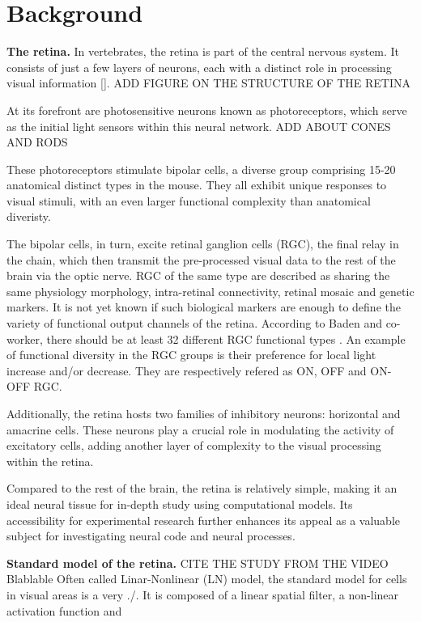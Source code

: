 \section{Background}\label{sec:background}

\textbf{The retina.}
In vertebrates, the retina is part of the central nervous system. It consists
of just a few layers of neurons, each with a distinct role in processing visual
information \ref*{}. ADD FIGURE ON THE STRUCTURE OF THE RETINA

At its forefront are photosensitive neurons known as photoreceptors, which
serve as the initial light sensors within this neural network. ADD ABOUT CONES
AND RODS

These photoreceptors stimulate bipolar cells, a diverse group comprising 15-20
anatomical
distinct types in the mouse. They all exhibit unique
responses to visual stimuli, with an even larger functional complexity than
anatomical diveristy. %

The bipolar cells, in turn, excite retinal ganglion cells (RGC), the final
relay in the
chain, which then transmit the pre-processed visual data to the rest of the
brain
via the optic nerve. RGC of the same type are described as sharing the same
physiology morphology,
intra-retinal connectivity, retinal mosaic and genetic markers. It is not yet
known if such biological markers are enough to define the variety of functional
output channels of the retina. According to Baden and co-worker, there should
be at least 32 different RGC
functional types \citep*{baden_functional_2016}. An example of functional
diversity in the RGC groups is their preference for local light increase and/or
decrease. They are respectively refered as ON, OFF and ON-OFF RGC.

Additionally, the retina hosts two families of inhibitory neurons: horizontal
and
amacrine cells. These neurons play a crucial role in modulating the activity of
excitatory cells, adding another layer of complexity to the visual processing
within the retina.

Compared to the rest of the brain, the retina is relatively simple,
making it an ideal neural tissue for in-depth study using computational models.
Its accessibility for experimental research further enhances its appeal as a
valuable subject for investigating neural code and neural processes.

\textbf{Standard model of the retina.}
CITE THE STUDY FROM THE VIDEO Blablable
Often called Linar-Nonlinear (LN) model, the standard model for cells in visual areas is a very ./.
It is composed of a linear spatial filter, a non-linear activation function and

